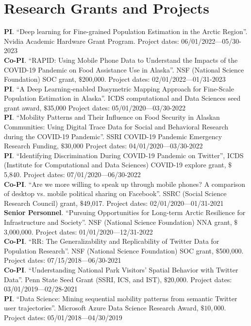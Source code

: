 \documentclass[11pt, a4paper]{article}
\begin{document}
\section*{Research Grants and Projects}
\textbf{PI}. ``Deep learning for Fine-grained Population Estimation in the Arctic Region''. Nvidia Academic Hardware Grant Program. Project dates: 06/01/2022—05/30-2023\\
\textbf{Co-PI}. ``RAPID: Using Mobile Phone Data to Understand the Impacts of the COVID-19 Pandemic on Food Assistance Use in Alaska''. NSF (National Science Foundation) SOC grant, $\$$200,000. Project dates: 02/01/2022—01/31-2023\\
\textbf{PI}. ``A Deep Learning-enabled Dasymetric Mapping Approach for Fine-Scale Population Estimation in Alaska''. ICDS computational and Data Sciences seed grant award, $\$$35,000 Project dates: 05/01/2020—03/30-2022\\
\textbf{PI}. ``Mobility Patterns and Their Influence on Food Security in Alaskan Communities: Using Digital Trace Data for Social and Behavioral Research during the COVID-19 Pandemic''. SSRI COVID-19 Pandemic Emergency Research Funding, $\$$30,000 Project dates: 04/01/2020—03/30-2022\\
\textbf{PI}. ``Identifying Discrimination During COVID-19 Pandemic on Twitter'',  ICDS (Institute for Computational and Data Sciences) COVID-19 explore grant, $\$$5,840. Project dates: 07/01/2020—06/30-2022\\
\textbf{Co-PI}. ``Are we more willing to speak up through mobile phones?  A comparison of desktop vs. mobile political sharing on Facebook''. SSRC (Social Science Research Council) grant, $\$$49,017. Project dates: 02/01/2020—01/31-2021\\
\textbf{Senior Personnel}. ``Pursuing Opportunities for Long-term Arctic Resilience for Infrastructure and Society''. NSF (National Science Foundation) NNA grant, $\$$3,000,000. Project dates: 01/01/2020—12/31-2022\\
\textbf{Co-PI}. ``RR: The Generalizability and Replicability of Twitter Data for Population Research''. NSF (National Science Foundation) SOC grant, $\$$500,000. Project dates: 07/15/2018—06/30-2021\\
\textbf{Co-PI}. ``Understanding National Park Visitors’ Spatial Behavior with Twitter Data''. Penn State Seed Grant (SSRI, ICS, and IST), $\$$20,000. Project dates: 03/01/2019—02/28-2021\\
\textbf{PI}. ``Data Science: Mining sequential mobility patterns from semantic Twitter user trajectories''. Microsoft Azure Data Science Research Award, $\$10,000$. Project dates: 05/01/2018—04/30/2019\\
\end{document}
